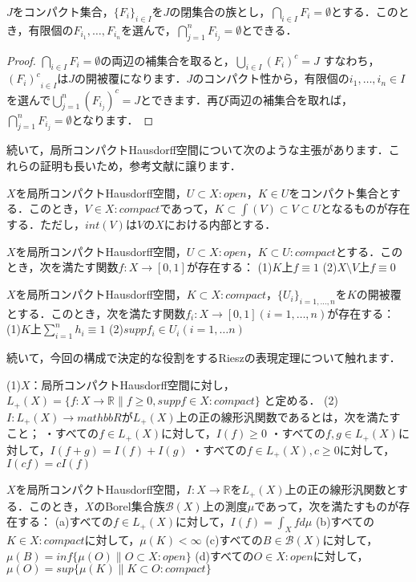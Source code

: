 \begin{lem}
$J$をコンパクト集合，$\{ F_i \}_{i \in I}$を$J$の閉集合の族とし，$\bigcap_{i \in I}F_i = \emptyset$とする．このとき，有限個の$F_{i_1}, \ldots , F_{i_n}$を選んで，$\bigcap_{j=1}^{n}F_{i_j} = \emptyset$とできる．
\end{lem}
\begin{proof}
$\bigcap_{i \in I}F_i = \emptyset$の両辺の補集合を取ると，$\bigcup_{i \in I}(F_i)^{c} = J$ すなわち，${(F_i)^{c}}_{i \in I}$は$J$の開被覆になります．$J$のコンパクト性から，有限個の$i_1, \ldots , i_n \in I$を選んで$\bigcup_{j=1}^{n}(F_{i_j})^{c} = J$とできます．再び両辺の補集合を取れば，$\bigcap_{j=1}^{n}F_{i_j} = \emptyset$となります．
\end{proof}
続いて，局所コンパクトHausdorff空間について次のような主張があります．これらの証明も長いため，参考文献に譲ります．
\begin{thm}
$X$を局所コンパクトHausdorff空間，$U \subset X \colon open$，$K \in U$をコンパクト集合とする．このとき，$V \in X :compact$であって，$K \subset \int(V) \subset V \subset U$となるものが存在する．ただし，$int(V)$は$V$の$X$における内部とする．
\end{thm}
\begin{thm}[urysohnの補題]
$X$を局所コンパクトHausdorff空間，$U \subset X \colon open$，$K \subset U \colon compact$とする．このとき，次を満たす関数$f \colon X \to [0, 1]$が存在する：
(1)$K$上$f \equiv 1$
(2)$X \setminus V$上$f \equiv 0$
\end{thm}
\begin{thm}[1の分割]
$X$を局所コンパクトHausdorff空間，$K \subset X \colon compact$，$\{ U_i \}_{i=1, \ldots , n}$を$K$の開被覆とする．このとき，次を満たす関数$f_i \colon X \to [0,1] (i=1, \ldots , n)$が存在する：
(1)$K$上$\sum_{i=1}^{n}h_i \equiv 1$
(2)$supp f_i \in U_i (i=1, \ldots n)$
\end{thm}
続いて，今回の構成で決定的な役割をするRieszの表現定理について触れます．
\begin{defi}
(1)$X$：局所コンパクトHausdorff空間に対し，
$L_{+}(X)= \{ f \colon X \to \mathbb{R} \| f \ge 0, supp f \in X \colon compact\}$ と定める．
(2)$I \colon L_{+}(X) \to mathbb{R}$が$L_{+}(X)$上の正の線形汎関数であるとは，次を満たすこと；
・すべての$f \in L_{+}(X)$に対して，$I(f) \ge 0$
・すべての$f,g \in L_{+}(X)$に対して，$I(f+g)=I(f)+I(g)$
・すべての$f \in L_{+}(X), c \ge 0$に対して，$I(cf)=cI(f)$
\end{defi}
\begin{thm}[Rieszの表現定理]
$X$を局所コンパクトHausdorff空間，$I \colon X \to \mathbb{R}$を$L_{+}(X)$上の正の線形汎関数とする．このとき，$X$のBorel集合族$\mathscr{B}(X)$上の測度$\mu$であって，次を満たすものが存在する：
(a)すべての$f \in L_{+}(X)$に対して，$I(f)=\int_{X}fd\mu$
(b)すべての$K \in X \colon compact$に対して，$\mu(K)<\infty$
(c)すべての$B \in \mathscr{B}(X)$に対して，$\mu(B)=inf \{ \mu(O) \| O \subset X \colon open \}$
(d)すべての$O \in X \colon open$に対して，$\mu(O)=sup \{ \mu(K) \| K \subset O \colon compact \}$
\end{thm}
